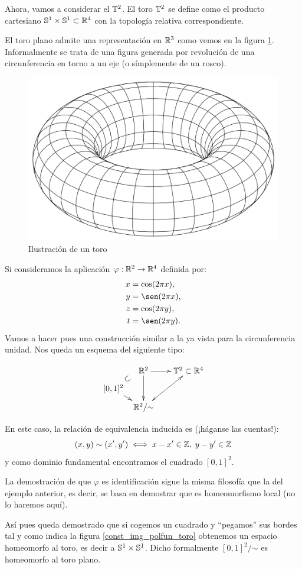 \begin{exa}[Toro]
	Ahora, vamos a considerar el  $\mathbb{T}^2$. El toro $\mathbb{T}^2$ se define como el producto cartesiano $\mathbb{S}^1\times \mathbb{S}^1\subset\mathbb{R}^4$ con la topología relativa correspondiente.
	
	El toro plano admite una representación en $\mathbb{R}^3$ como vemos en la figura \ref{toro}. Informalmente se trata de una figura generada por revolución de una circunferencia en torno a un eje (o símplemente de un rosco).
	
	\begin{figure}[h!]
		\centering
		\includegraphics[scale = 0.15]{img/toro}
		\caption{Ilustración de un toro}
		\label{toro}
	\end{figure}
	Si consideramos la aplicación $\varphi:\mathbb{R}^2\to\mathbb{R}^4$ definida por:
	\[\begin{split}
	x&=\cos(2\pi x),\\
	y&=\sen(2\pi x),\\
	z&=\cos(2\pi y),\\
	t&=\sen(2\pi y).
	\end{split}\]
	Vamos a hacer pues una construcción similar a la ya vista para la circunferencia unidad. Nos queda un esquema del siguiente tipo:
	
	\[\xymatrix @C=0.5pc @R=0.5pc @L=-0.2pc {
		& \R^2\ar[rr] \ar[dd] & &
		\toro^2\subset\R^4 \\
		[0,1]^2 \ar@{}[ur]^*[@]{\subset} \ar[dr] \\
		& \R^2/\mathord{\sim}  \ar@{<->}[rruu]
	}\]
	
	En este caso, la relación de equivalencia inducida es (¡háganse las cuentas!):
	\[(x,y)\sim (x',y')\iff x-x'\in\mathbb{Z},\;y-y'\in\mathbb{Z}\]
	y como dominio fundamental encontramos el cuadrado $[0,1]^2$.
	
	La demostración de que $\varphi$ es identificación sigue la misma filosofía que la del ejemplo anterior, es decir, se basa en demostrar que es homeomorfismo local (no lo haremos aquí).
	
	Así pues queda demostrado que si cogemos un cuadrado y ``pegamos'' sus bordes tal y como indica la figura \ref{const_img_polfun_toro} obtenemos un espacio homeomorfo al toro, es decir a $\mathbb{S}^1\times \mathbb{S}^1$. Dicho formalmente $[0,1]^2/\mathord{\sim}$ es homeomorfo al toro plano.
	\end{exa}
